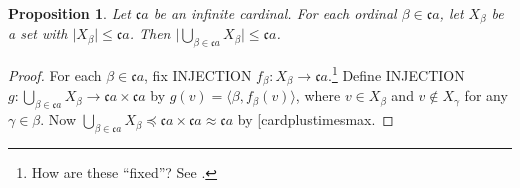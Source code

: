 \documentclass[10pt,a4paper]{article}
\makeatletter
\newcommand*{\olup}[1]{\MakeUppercase{#1}}
\theoremstyle{plain}
\newtheorem{prop}[thm]{Proposition}
\theoremstyle{definition}
\theoremstyle{remark}
\newcommand*{\ollabel}[1]{\label{#1}}
\newcommand{\olref}{\@ifnextchar[{\olref@i}{\olref@final}}
\def\olref@i[#1]{\@ifnextchar[{\olref@ii}{\olref@final}}
\def\olref@ii[#1]{\@ifnextchar[{\olref@iii}{\olref@final}}
\def\olref@iii[#1]{\olref@final}
\def\olref@final#1{\ref{#1}}
\providecommand{\tuple}[1]{\langle #1 \rangle}
\providecommand{\card}[1]{\lvert #1 \rvert}
\providecommand{\cardfont}{\mathfrak{c}}
\makeatother
\begin{document}
\begin{prop}\ollabel{kappaunionkappasize}
Let $\cardfont{a}$ be an infinite cardinal. For each ordinal $\beta
\in \cardfont{a}$, let $X_\beta$ be a set with $\card{X_\beta} \leq
\cardfont{a}$. Then $\card{\bigcup_{\beta \in \cardfont{a}} X_\beta}
\leq \cardfont{a}$.
\end{prop}

\begin{proof}
For each $\beta \in \cardfont{a}$, fix \olup{injection} $f_\beta \colon
X_\beta \to \cardfont{a}$.\footnote{How are these ``fixed''? See \olref[sth][choice][countablechoice]{sec}.} Define \olup{injection} $g \colon
\bigcup_{\beta \in \cardfont{a}} X_\beta \to \cardfont{a} \times
\cardfont{a}$ by $g(v) = \tuple{\beta, f_\beta(v)}$, where $v \in
X_\beta$ and $v \notin X_\gamma$ for any $\gamma \in \beta$. Now
$\bigcup_{\beta \in \cardfont{a}} X_\beta \preceq \cardfont{a} \times
\cardfont{a} \approx \cardfont{a}$ by \olref{cardplustimesmax}.
\end{proof}
\end{document}
